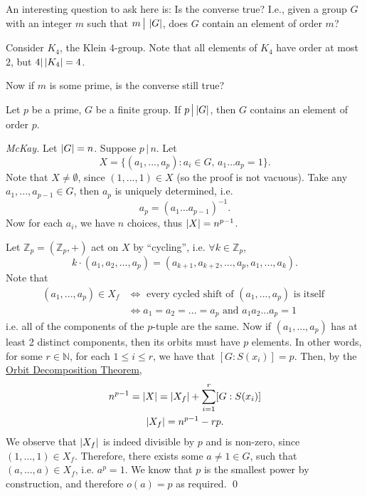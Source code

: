 An interesting question to ask here is: Is the converse true? I.e., given a group $G$ with an integer $m$ such that $m \, \big| \, \left|G\right|$, does $G$ contain an element of order $m$?

Consider $K_4$, the Klein $4$-group. Note that all elements of $K_4$ have order at most $2$, but $4 | \left|K_4\right| = 4$.

Now if $m$ is some prime, is the converse still true?

\begin{thm}
\label{thm:cauchy}
  Let $p$ be a prime, $G$ be a finite group. If $p \, \big| \left|G\right|$, then $G$ contains an element of order $p$.
\end{thm}

\begin{proof}[McKay]
  Let $\left|G\right| = n$. Suppose $p \, | \, n$. Let
  \begin{equation*}
    X = \{(a_1, ..., a_p) : a_i \in G, \, a_1 \hdots a_p = 1 \}.
  \end{equation*}
  Note that $X \neq \emptyset$, since $(1, ..., 1) \in X$ (so the proof is not vacuous). Take any $a_1, ..., a_{p - 1} \in G$, then $a_p$ is uniquely determined, i.e.
  \begin{equation*}
    a_p = (a_1 \hdots a_{p - 1})^{-1}.
  \end{equation*}
  Now for each $a_i$, we have $n$ choices, thus $\left|X\right| = n^{p - 1}$.

  Let $\mathbb{Z}_p = ( \mathbb{Z}_p, + )$ act on $X$ by ``cycling'', i.e. $\forall k \in \mathbb{Z}_p$,
  \begin{equation*}
    k \cdot (a_1, a_2, ..., a_p) = (a_{k + 1}, a_{k + 2}, ..., a_p, a_1, ..., a_k).
  \end{equation*}
   Note that \\
  \begin{align*}
    (a_1, ..., a_p) \in X_f &\iff \text{ every cycled shift of } (a_1, ..., a_p) \text{ is itself } \\
      &\iff a_1 = a_2 = \hdots = a_p \text{ and } a_1 a_2 ... a_p = 1
  \end{align*}
  i.e. all of the components of the $p$-tuple are the same. Now if $(a_1, ..., a_p)$ has at least 2 distinct components, then its orbits must have $p$ elements. In other words, for some $r \in \mathbb{N}$, for each $1 \leq i \leq r$, we have that $[ G : S(x_i) ] = p$. Then, by the \hyperref[thm:orbit_decomposition_theorem]{Orbit Decomposition Theorem},
  \begin{gather*}
    n^{p - 1} = \left|X\right| = \left|X_f\right| + \sum_{i=1}^{r} [ G : S(x_i) ] \\
    \left|X_f\right| = n^{p - 1} - rp.
  \end{gather*}
  We observe that $\left|X_f\right|$ is indeed divisible by $p$ and is non-zero, since $(1, ..., 1) \in X_f$. Therefore, there exists some $a \neq 1 \in G$, such that $(a, ..., a) \in X_f$, i.e. $a^p = 1$. We know that $p$ is the smallest power by construction, and therefore $o(a) = p$ as required. \qed
\end{proof}



